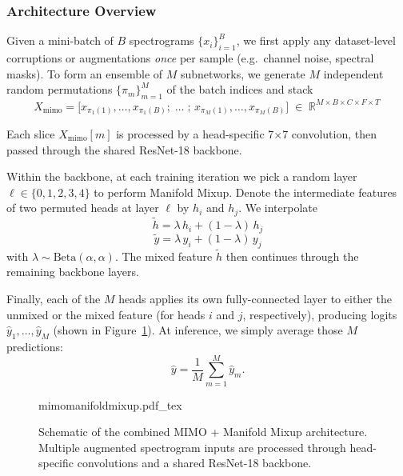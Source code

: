 \subsubsection{Architecture Overview}
Given a mini-batch of \(B\) spectrograms \(\{x_i\}_{i=1}^B\), we first apply any dataset-level corruptions or augmentations \emph{once} per sample (e.g.\ channel noise, spectral masks).  To form an ensemble of \(M\) subnetworks, we generate \(M\) independent random permutations \(\{\pi_m\}_{m=1}^M\) of the batch indices and stack
\begin{equation}
X_{\mathrm{mimo}} = \bigl[x_{\pi_1(1)},\dots,x_{\pi_1(B)};\;\dots\;;\,x_{\pi_M(1)},\dots,x_{\pi_M(B)}\bigr]\;\in\;\mathbb{R}^{M\times B\times C\times F\times T}\,
\end{equation}

Each slice \(X_{\mathrm{mimo}}[m]\) is processed by a head-specific 7×7 convolution, then passed through the shared ResNet-18 backbone.

Within the backbone, at each training iteration we pick a random layer \(\ell\in\{0,1,2,3,4\}\) to perform Manifold Mixup.  Denote the intermediate features of two permuted heads at layer \(\ell\) by \(h_i\) and \(h_j\).  We interpolate
\begin{equation}
 \tilde{h} = \lambda\,h_i + (1-\lambda)\,h_j  
\end{equation}
\begin{equation}
\tilde{y} = \lambda\,y_i + (1-\lambda)\,y_j
\end{equation}
with \(\lambda\sim\mathrm{Beta}(\alpha,\alpha)\).  The mixed feature \(\tilde{h}\) then continues through the remaining backbone layers.

Finally, each of the \(M\) heads applies its own fully-connected layer to either the unmixed or the mixed feature (for heads \(i\) and \(j\), respectively), producing logits \(\hat y_1,\dots,\hat y_M\) (shown in Figure~\ref{fig:mimomanifoldmiup}).  At inference, we simply average those \(M\) predictions:
\[
\hat y = \frac1M\sum_{m=1}^M \hat y_m.
\]

\begin{figure}[h!]
	\centering
    \def\svgwidth{410pt}
    \fontsize{8pt}{8pt}
 	{mimomanifoldmixup.pdf_tex} 	 	
	\caption[Schematic of the combined MIMO + Manifold Mixup architecture.]{Schematic of the combined MIMO + Manifold Mixup architecture. Multiple augmented spectrogram inputs are processed through head-specific convolutions and a shared ResNet-18 backbone.}
	\label{fig:mimomanifoldmiup}
\end{figure}


